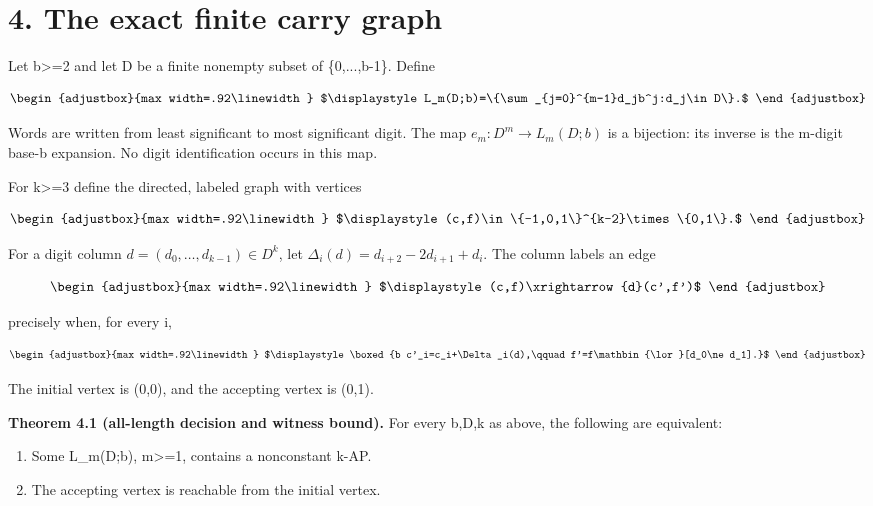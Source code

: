 \section{4. The exact finite carry graph}\label{n03-the-exact-finite-carry-graph}

Let b\textgreater=2 and let D be a finite nonempty subset of \{0,...,b-1\}. Define

\[
\begin{adjustbox}{max width=.92\linewidth}
$\displaystyle L_m(D;b)=\{\sum_{j=0}^{m-1}d_jb^j:d_j\in D\}.$
\end{adjustbox}
\]

Words are written from least significant to most significant digit. The map \(e_m:D^m\to L_m(D;b)\) is a bijection: its inverse is the m-digit base-b expansion. No digit identification occurs in this map.

For k\textgreater=3 define the directed, labeled graph with vertices

\[
\begin{adjustbox}{max width=.92\linewidth}
$\displaystyle (c,f)\in\{-1,0,1\}^{k-2}\times\{0,1\}.$
\end{adjustbox}
\]

For a digit column \(d=(d_0,\ldots,d_{k-1})\in D^k\), let \(\Delta_i(d)=d_{i+2}-2d_{i+1}+d_i\). The column labels an edge

\[
\begin{adjustbox}{max width=.92\linewidth}
$\displaystyle (c,f)\xrightarrow{d}(c',f')$
\end{adjustbox}
\]

precisely when, for every i,

\[
\begin{adjustbox}{max width=.92\linewidth}
$\displaystyle \boxed{b c'_i=c_i+\Delta_i(d),\qquad
f'=f\mathbin{\lor}[d_0\ne d_1].}$
\end{adjustbox}
\]

The initial vertex is (0,0), and the accepting vertex is (0,1).

\textbf{Theorem 4.1 (all-length decision and witness bound).} For every b,D,k as above, the following are equivalent:

\begin{enumerate}
\def\labelenumi{(\alph{enumi})}
\item
  Some L\_m(D;b), m\textgreater=1, contains a nonconstant k-AP.
\item
  The accepting vertex is reachable from the initial vertex.
\end{enumerate}

